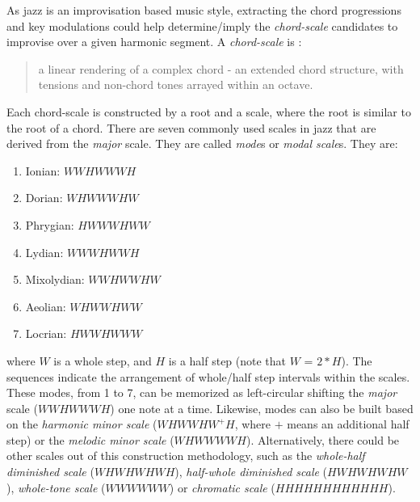 As jazz is an improvisation based music style, extracting the chord progressions and key modulations could help determine/imply the {\it chord-scale} candidates to improvise over a given harmonic segment. A {\it chord-scale} is \cite{hojnackijazz}:
\begin{quote}
a linear rendering of a complex chord - an extended chord structure, with tensions and non-chord tones arrayed within an octave.
\end{quote}
Each chord-scale is constructed by a root and a scale, where the root is similar to the root of a chord. There are seven commonly used scales in jazz that are derived from the \textit{major} scale. They are called {\it mode}s or {\it modal scale}s. They are:
\begin{enumerate}
\item Ionian: $WWHWWWH$
\item Dorian: $WHWWWHW$
\item Phrygian: $HWWWHWW$
\item Lydian: $WWWHWWH$
\item Mixolydian: $WWHWWHW$
\item Aeolian: $WHWWHWW$
\item Locrian: $HWWHWWW$
\end{enumerate}
where $W$ is a whole step, and $H$ is a half step (note that $W$ = $2*H$). The sequences indicate the arrangement of whole/half step intervals within the scales. These modes, from 1 to 7, can be memorized as left-circular shifting the \textit{major} scale ($WWHWWWH$) one note at a time. Likewise, modes can also be built based on the {\it harmonic minor scale} ($WHWWHW^+H$, where $+$ means an additional half step) or the {\it melodic minor scale} ($WHWWWWH$). Alternatively, there could be other scales out of this construction methodology, such as the {\it whole-half diminished scale} ($WHWHWHWH$), {\it half-whole diminished scale} ($HWHWHWHW$), {\it whole-tone scale} ($WWWWWW$) or {\it chromatic scale} ($HHHHHHHHHHHH$).

